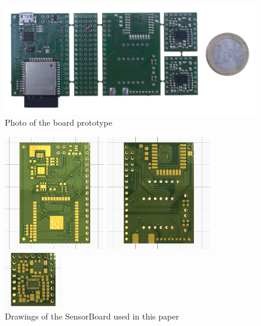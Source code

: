 \begin{figure}
	\centering
	\label{fig:SensorBoardDrawings}
	\caption{Drawings of the SensorBoard used in this paper}
	\includegraphics[width=\linewidth]{img/PCBphoto.jpg}
	\\Photo of the board prototype\\
	\vspace{1cm}
	\begin{minipage}[c]{.3\textwidth}
		\includegraphics[height=5cm]{img/renderBottom.png}
	\end{minipage}
	\quad\quad
	\begin{minipage}[c]{.3\textwidth}
		\includegraphics[height=5cm]{img/renderTop.png}
	\end{minipage}
	\quad\quad
	\begin{minipage}[c]{.15\textwidth}
		\includegraphics[height=2.5cm]{img/renderBMF.png}

\end{minipage}
\end{figure}
